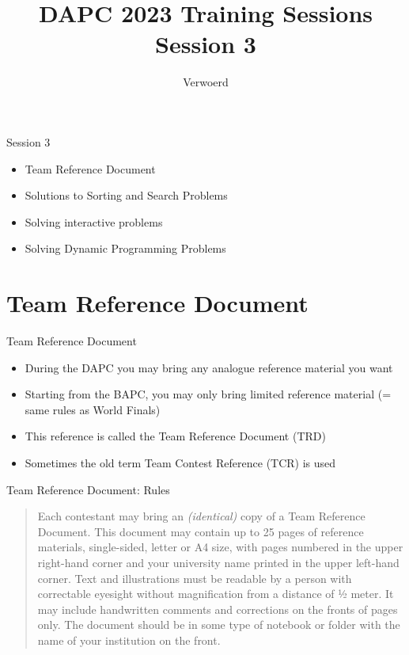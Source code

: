 \documentclass[11pt,pdf, aspectratio=169]{beamer}
\title{DAPC 2023 Training Sessions\\Session 3}
\author{Verwoerd}
\begin{document}
  \maketitle
  \begin{frame}{Session 3}
    \begin{itemize}
      \item Team Reference Document
      \item Solutions to Sorting and Search Problems
      \item Solving interactive problems
      \item Solving Dynamic Programming Problems
    \end{itemize}
    \doclicenseThis
  \end{frame}


  \section{Team Reference Document}
  \begin{frame}{Team Reference Document}
    \begin{itemize}
      \item During the DAPC you may bring any analogue reference material you want
      \item Starting from the BAPC, you may only bring limited reference material
          (= same rules as World Finals)
      \item This reference is called the Team Reference Document (TRD)
      \item Sometimes the old term Team Contest Reference (TCR) is used
    \end{itemize}
  \end{frame}
  \begin{frame}{Team Reference Document: Rules}
    \begin{quote}
      Each contestant may bring an \emph{(identical)} copy of a Team Reference Document.
      This document may contain up to 25 pages of reference materials, single-sided, letter or A4 size, with pages numbered in the upper right-hand corner and your university name printed in the upper left-hand corner.
      Text and illustrations must be readable by a person with correctable eyesight without magnification from a distance of ½ meter.
      It may include handwritten comments and corrections on the fronts of pages only.
      The document should be in some type of notebook or folder with the name of your institution on the front.
    \end{quote}
  \end{frame}
\end{document}
